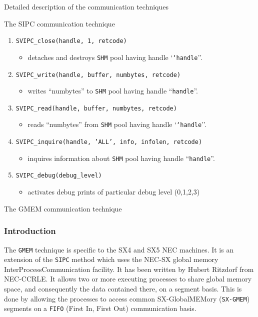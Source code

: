 \begin{section}{Detailed description of the communication techniques}
\begin{subsection}{The SIPC communication technique}
\begin{enumerate}
\item {\tt SVIPC\_close(handle, 1, retcode)}

  \begin{itemize}
    \item detaches and destroys {\tt SHM} pool having handle `{\tt `handle}''.
 \end{itemize}

\item {\tt SVIPC\_write(handle, buffer, numbytes, retcode)}

 \begin{itemize}
    \item writes ``numbytes'' to {\tt SHM} pool having handle ``{\tt handle}''.
 \end{itemize}

\item {\tt SVIPC\_read(handle, buffer, numbytes, retcode)}

 \begin{itemize}
    \item reads ``numbytes'' from {\tt SHM} pool having handle `{\tt `handle}''.
 \end{itemize}

\item{\tt  SVIPC\_inquire(handle, 'ALL', info, infolen, retcode)}

 \begin{itemize}
    \item inquires information about {\tt SHM}  pool having handle ``{\tt handle}''.
 \end{itemize}

\item {\tt SVIPC\_debug(debug\_level)}

 \begin{itemize}
    \item  activates debug prints of particular debug level (0,1,2,3)
 \end{itemize}

\end{enumerate}

\end{subsection}

\begin{subsection}{The GMEM communication technique}
\label{subsec_gmemcomm}
\subsubsection{Introduction}
The {\tt GMEM} technique is specific to the SX4 and SX5 NEC machines. It is an 
extension of the {\tt SIPC} method which uses the NEC-SX global memory 
InterProcessCommunication facility. 
It has been written by Hubert Ritzdorf from NEC-CCRLE. It allows
two or more executing processes to share global memory space, 
and consequently the data 
contained there, on a segment basis. This is done by allowing the processes to
access common SX-GlobalMEMory ({\tt SX-GMEM}) segments on a 
{\tt FIFO} (First In, First Out) communication basis. 


\end{subsection}
\end{section}
